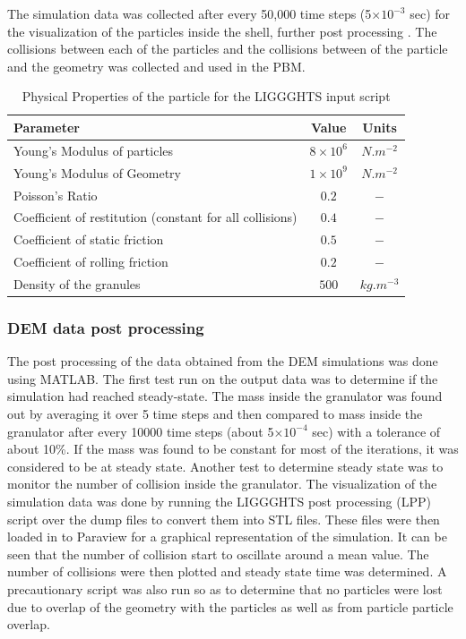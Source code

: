 \documentclass[preprint,11pt,authoryear]{elsarticle}
\begin{document}
The simulation data was collected after every 50,000 time steps (5$\times 10^{-3}$ sec) 
for the visualization of the particles inside the shell, further post processing . The collisions 
between each of the particles and the collisions between of the particle and the geometry was 
collected and used in the PBM. 

\begin{table}
\caption{Physical Properties of the particle for the LIGGGHTS input script} 
\label{table:mthds_dem_input}
\begin{center}
\begin{tabular}{l|c|c}
\hline
\bf{Parameter} &\bf{Value} &\bf{Units}\\
\hline
Young's Modulus of particles  & $8 \times 10^{6}$ & $N.m^{-2}$\\
Young's Modulus of Geometry  & $1 \times 10^{9}$ & $N.m^{-2}$\\
Poisson's Ratio & $0.2$ & $-$\\
Coefficient of restitution (constant for all collisions) & $0.4$ & $-$\\
Coefficient of static friction & $0.5$ & $-$\\
Coefficient of rolling friction  & $0.2$ & $-$\\
Density of the granules & $500$ & $kg.m^{-3}$\\
\hline
\end{tabular}
\end{center}
\end{table}

\subsubsection{DEM data post processing}
The post processing of the data obtained from the DEM simulations was done using MATLAB. 
The first test run on the output data was to determine if the simulation had reached steady-state. The 
mass inside the granulator was found out by averaging it over 5 time steps and then compared to 
mass inside the granulator after every 10000 time steps (about 5$\times 10^{-4}$ sec) with a 
tolerance of about 10\%. If the mass was found to be constant for most of the iterations, it was 
considered to be at steady state. Another test to determine steady state was to monitor the number of 
collision inside the granulator. The visualization of the simulation data was done by running the 
LIGGGHTS post processing (LPP) script over the dump files to convert them into STL files. These 
files were then loaded in to Paraview \citep{henderson2004} for a graphical 
representation of the 
simulation. It can be seen that the number of collision start to oscillate around a mean value. The 
number of collisions were then plotted and steady state time was determined.
A precautionary script was also run so as to determine that no particles were lost due to overlap 
of the geometry with the particles as well as from particle particle overlap.
\end{document}
